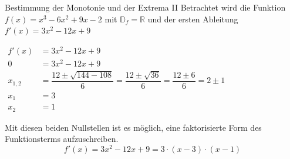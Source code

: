 \begin{bsp}{Bestimmung der Monotonie und der Extrema II}{}
Betrachtet wird die Funktion $f(x)= x^3-6x^2 +9x-2$ mit $\mathds{D}_f =\mathds{R}$ und der ersten Ableitung $f'(x)= 3x^2 -12x +9$
\begin{center}$\begin{aligned}
	f'(x)&= 3x^2 -12x +9\\
    0 &= 3x^2 -12x +9\\
    x_{1,2} &= \dfrac{12 \pm \sqrt{144 -108} }{6} = \dfrac{12\pm \sqrt{36}}{6} = \dfrac{12 \pm 6}{6} = 2\pm 1\\
    x_1&= 3\\
    x_2&= 1
	\end{aligned}$\end{center}
 Mit diesen beiden Nullstellen ist es möglich, eine faktorisierte Form des Funktionsterms aufzuschreiben. $$f'(x)= 3x^2-12x+9 = 3\cdot \left(x-3 \right)\cdot \left(x-1 \right)$$


\end{bsp}
